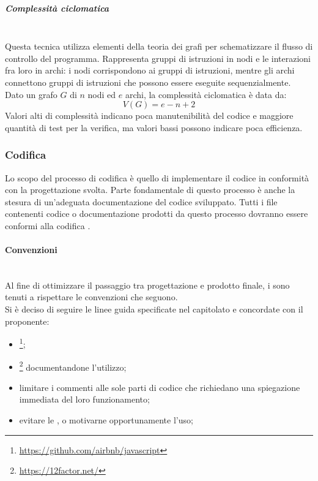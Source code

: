 \subparagraph{Complessità ciclomatica}\mbox{}\\
Questa tecnica utilizza elementi della teoria dei grafi per schematizzare il flusso di controllo del programma. Rappresenta gruppi di istruzioni in nodi e le interazioni fra loro in archi: i nodi corrispondono ai gruppi di istruzioni, mentre gli archi connettono gruppi di istruzioni che possono essere eseguite sequenzialmente.\\
Dato un grafo $G$ di $n$ nodi ed $e$ archi, la complessità ciclomatica è data da:
\[ V\left(G\right) = e - n + 2 \]
Valori alti di complessità indicano poca manutenibilità del codice e maggiore quantità di test per la verifica, ma valori bassi possono indicare poca efficienza.

\subsubsection{Codifica}
Lo scopo del processo di codifica è quello di implementare il codice in conformità con la progettazione svolta. Parte fondamentale di questo processo è anche la stesura di un'adeguata documentazione del codice sviluppato. Tutti i file contenenti codice o documentazione prodotti da questo processo dovranno essere conformi alla codifica .

\paragraph{Convenzioni} \label{sec:convenzioni}\mbox{}\\
Al fine di ottimizzare il passaggio tra progettazione e prodotto finale, i \Programmatori{} sono tenuti a rispettare le convenzioni che seguono.\\
Si è deciso di seguire le linee guida specificate nel capitolato e concordate con il proponente:
\begin{itemize}
	\item {}\footnote{\url{https://github.com/airbnb/javascript}};
	\item {}\footnote{\url{https://12factor.net/}} documentandone l'utilizzo;
	\item limitare i commenti alle sole parti di codice che richiedano una spiegazione immediata del loro funzionamento;
	\item evitare le , o motivarne opportunamente l’uso;
\end{itemize}

